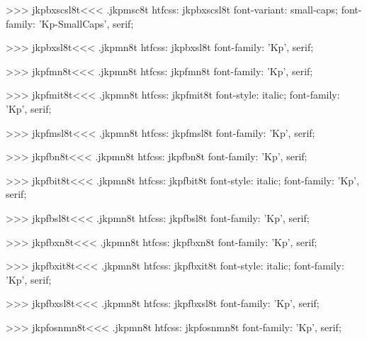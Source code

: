 >>>
\<jkpbxscsl8t\><<<
.jkpmsc8t
htfcss:  jkpbxscsl8t  font-variant: small-caps; font-family: 'Kp-SmallCaps', serif;

>>>
\<jkpbxsl8t\><<<
.jkpmn8t
htfcss:  jkpbxsl8t  font-family: 'Kp', serif;

>>>
\<jkpfmn8t\><<<
.jkpmn8t
htfcss:  jkpfmn8t  font-family: 'Kp', serif;

>>>
\<jkpfmit8t\><<<
.jkpmn8t
htfcss:  jkpfmit8t  font-style: italic; font-family: 'Kp', serif;

>>>
\<jkpfmsl8t\><<<
.jkpmn8t
htfcss:  jkpfmsl8t  font-family: 'Kp', serif;

>>>
\<jkpfbn8t\><<<
.jkpmn8t
htfcss:  jkpfbn8t  font-family: 'Kp', serif;

>>>
\<jkpfbit8t\><<<
.jkpmn8t
htfcss:  jkpfbit8t  font-style: italic; font-family: 'Kp', serif;

>>>
\<jkpfbsl8t\><<<
.jkpmn8t
htfcss:  jkpfbsl8t  font-family: 'Kp', serif;

>>>
\<jkpfbxn8t\><<<
.jkpmn8t
htfcss:  jkpfbxn8t  font-family: 'Kp', serif;

>>>
\<jkpfbxit8t\><<<
.jkpmn8t
htfcss:  jkpfbxit8t  font-style: italic; font-family: 'Kp', serif;

>>>
\<jkpfbxsl8t\><<<
.jkpmn8t
htfcss:  jkpfbxsl8t  font-family: 'Kp', serif;

>>>
\<jkpfosnmn8t\><<<
.jkpmn8t
htfcss:  jkpfosnmn8t  font-family: 'Kp', serif;

